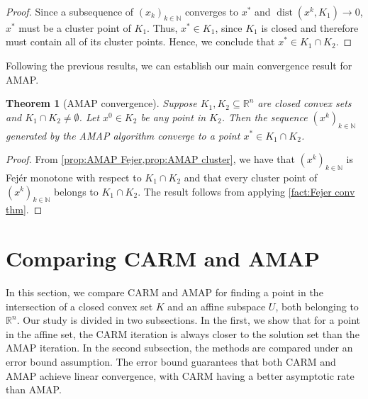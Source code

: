 \documentclass[smallextended,numbook,nospthms]{svjour3}
\theoremstyle{plain}
\newtheorem{theorem}{Theorem}[subsection]
\theoremstyle{definition}
\def\RR{\mathds R}
\def\NN{\mathds N}
\DeclareMathOperator{\dist}{dist}
\begin{document}
\begin{proof}
Since a subsequence of $(x_k)_{k\in\NN}$ converges to $x^{*}$ and $\dist(x^{k},K_{1}) \rightarrow 0$, $x^{*}$ must be a cluster point of $K_{1}$. Thus, $x^{*} \in K_{1}$, since $K_{1}$ is closed and therefore must contain all of its cluster points. Hence,  we conclude that $x^{*} \in K_{1} \cap K_{2}$. 
\end{proof}


Following the previous results, we can establish our main convergence result for AMAP.

\begin{theorem}[AMAP convergence]\label{thm:AMAP conv} 
	Suppose $K_{1},K_{2} \subseteq \RR^{n}$ are closed convex sets and $K_{1} \cap K_{2} \neq \emptyset$. Let $x^{0} \in K_{2}$ be any point in $K_{2}$. Then the sequence $\left(x^{k}\right)_{k \in \NN}$ generated by the AMAP algorithm converge to a point $x^{*} \in K_{1} \cap K_{2}$.
\end{theorem}
\begin{proof}
	From \cref{prop:AMAP Fejer,prop:AMAP cluster}, we have that $\left(x^{k}\right)_{k \in \NN}$ is Fejér monotone with respect to $K_{1} \cap K_{2}$ and that every cluster point of $\left(x^{k}\right)_{k \in \NN}$ belongs to $K_{1} \cap K_{2}$. The result follows from applying \cref{fact:Fejer conv thm}.
\end{proof}




\newpage
\section{Comparing CARM and AMAP}\label{sec:comp}
In this section, we compare CARM and AMAP for finding a point in the intersection of a closed convex set $K$ and an affine subspace $U$, both belonging to $\RR^{n}$. Our study is divided in two subsections. In the first, we show that for a point in the affine set, the CARM iteration is always closer to the solution set than the AMAP iteration. In the second subsection, the methods are compared under an error bound assumption. The error bound guarantees that both CARM and AMAP achieve linear convergence, with CARM having a better asymptotic rate than AMAP.
\end{document}
